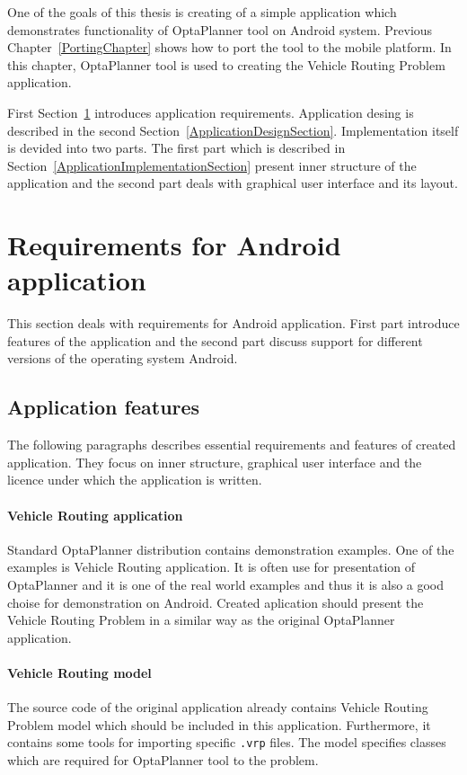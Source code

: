 One of the goals of this thesis is creating of a simple application which demonstrates functionality of OptaPlanner tool
on Android system. Previous Chapter~\ref{PortingChapter} shows how to port the tool to the mobile platform. In this
chapter, OptaPlanner tool is used to creating the Vehicle Routing Problem application.

First Section~\ref{RequirementsApplicationSection} introduces application requirements. Application desing is described
in the second Section~\ref{ApplicationDesignSection}. Implementation itself is devided into two parts. The first part
which is described in Section~\ref{ApplicationImplementationSection} present inner structure of the application and the
second part deals with graphical user interface and its layout.

\section{Requirements for Android application}\label{RequirementsApplicationSection}
This section deals with requirements for Android application. First part introduce features of the application and the
second part discuss support for different versions of the operating system Android.

\subsection{Application features}\label{FeaturesSection}
The following paragraphs describes essential requirements and features of created application. They focus on inner
structure, graphical user interface and the licence under which the application is written.

\paragraph{Vehicle Routing application}
Standard OptaPlanner distribution \cite{OptaPlannerDistribution} contains demonstration examples. One of the examples is
Vehicle Routing application. It is often use for presentation of OptaPlanner and it is one of the real world examples
and thus it is also a good choise for demonstration on Android. Created aplication should present the Vehicle Routing
Problem in a similar way as the original OptaPlanner application.

\paragraph{Vehicle Routing model}
The source code of the original application already contains Vehicle Routing Problem model which should be included in
this application. Furthermore, it contains some tools for importing specific \texttt{.vrp} files. The model specifies
classes which are required for OptaPlanner tool to the problem.

